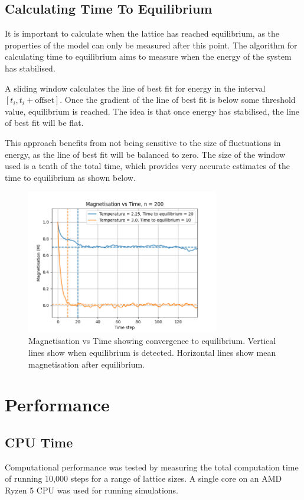 \documentclass[a4paper, 12pt]{article}
\begin{document}
	\newpage
	\subsection{Calculating Time To Equilibrium}
	It is important to calculate when the lattice has reached equilibrium, as the properties of the model can only be measured after this point. The algorithm for calculating time to equilibrium aims to measure when the energy of the system has stabilised. 

A sliding window calculates the line of best fit for energy in the interval \([t_i, t_i + \text{offset}]\). Once the gradient of the line of best fit is below some threshold value, equilibrium is reached. The idea is that once energy has stabilised, the line of best fit will be flat. 

This approach benefits from not being sensitive to the size of fluctuations in energy, as the line of best fit will be balanced to zero. The size of the window used is a tenth of the total time, which provides very accurate estimates of the time to equilibrium as shown below.
\begin{figure}[H]
\centering
\includegraphics[width=0.75\textwidth]{./resources/magvstime_2T.png}
\caption{Magnetisation vs Time showing convergence to equilibrium. Vertical lines show when equilibrium is detected. Horizontal lines show mean magnetisation after equilibrium.}
\end{figure}




    \newpage
    \section{Performance}
\subsection{CPU Time}
Computational performance was tested by measuring the total computation time of running 10,000 steps for a range of lattice sizes. A single core on an AMD Ryzen 5 CPU was used for running simulations.
\end{document}
